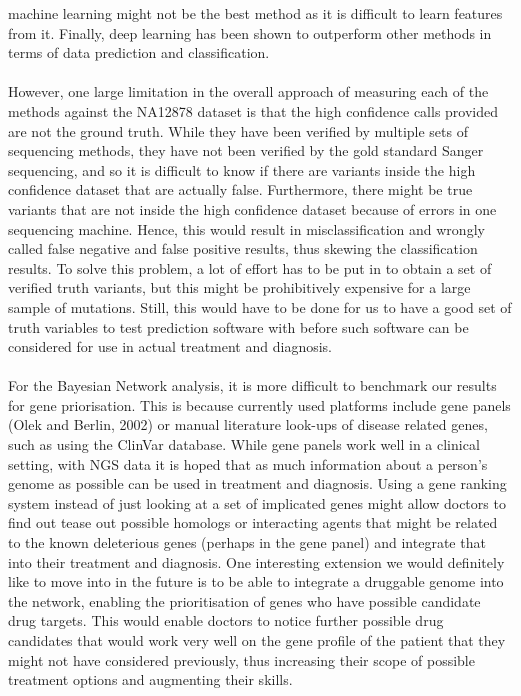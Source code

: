 \documentclass{article}
\begin{document}
machine learning might not be the best method as it is difficult to learn features from it. Finally, deep learning has been shown to outperform other methods in terms of data prediction and classification. \\\\

However, one large limitation in the overall approach of measuring each of the methods against the NA12878 dataset is that the high confidence calls provided are not the ground truth. While they have been verified by multiple sets of sequencing methods, they have not been verified by the gold standard Sanger sequencing, and so it is difficult to know if there are variants inside the high confidence dataset that are actually false. Furthermore, there might be true variants that are not inside the high confidence dataset because of errors in one sequencing machine. Hence, this would result in misclassification and wrongly called false negative and false positive results, thus skewing the classification results. To solve this problem, a lot of effort has to be put in to obtain a set of verified truth variants, but this might be prohibitively expensive for a large sample of mutations. Still, this would have to be done for us to have a good set of truth variables to test prediction software with before such software can be considered for use in actual treatment and diagnosis. \\\\

For the Bayesian Network analysis, it is more difficult to benchmark our results for gene priorisation. This is because currently used platforms include gene panels (Olek and Berlin, 2002) or manual literature look-ups of disease related genes, such as using the ClinVar database. While gene panels work well in a clinical setting, with NGS data it is hoped that as much information about a person's genome as possible can be used in treatment and diagnosis. Using a gene ranking system instead of just looking at a set of implicated genes might allow doctors to find out tease out possible homologs or interacting agents that might be related to the known deleterious genes (perhaps in the gene panel) and integrate that into their treatment and diagnosis. One interesting extension we would definitely like to move into in the future is to be able to integrate a druggable genome into the network, enabling the prioritisation of genes who have possible candidate drug targets. This would enable doctors to notice further possible drug candidates that would work very well on the gene profile of the patient that they might not have considered previously, thus increasing their scope of possible treatment options and augmenting their skills. \\\\
\end{document}
